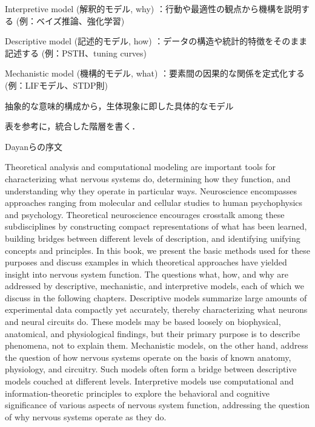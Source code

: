 \documentclass[titlepage]{ltjsbook}
\begin{document}
Interpretive model (解釈的モデル, why) ：行動や最適性の観点から機構を説明する (例：ベイズ推論、強化学習) 

Descriptive model (記述的モデル, how) ：データの構造や統計的特徴をそのまま記述する (例：PSTH、tuning curves) 

Mechanistic model (機構的モデル, what) ：要素間の因果的な関係を定式化する (例：LIFモデル、STDP則) 

抽象的な意味的構成から，生体現象に即した具体的なモデル



表を参考に，統合した階層を書く．


%


Dayanらの序文

Theoretical analysis and computational modeling are important tools for characterizing what nervous systems do, determining how they function, and understanding why they operate in particular ways. Neuroscience encompasses approaches ranging from molecular and cellular studies to human psychophysics and psychology. Theoretical neuroscience encourages crosstalk among these subdisciplines by constructing compact representations of what has been learned, building bridges between different levels of description, and identifying unifying concepts and principles. In this book, we present the basic methods used for these purposes and discuss examples in which theoretical approaches have yielded insight into nervous system function. The questions what, how, and why are addressed by descriptive, mechanistic, and interpretive models, each of which we discuss in the following chapters. Descriptive models summarize large amounts of experimental data compactly yet accurately, thereby characterizing what neurons and neural circuits do. These models may be based loosely on biophysical, anatomical, and physiological findings, but their primary purpose is to describe phenomena, not to explain them. Mechanistic models, on the other hand, address the question of how nervous systems operate on the basis of known anatomy, physiology, and circuitry. Such models often form a bridge between descriptive models couched at different levels. Interpretive models use computational and information-theoretic principles to explore the behavioral and cognitive significance of various aspects of nervous system function, addressing the question of why nervous systems operate as they do.
\end{document}
